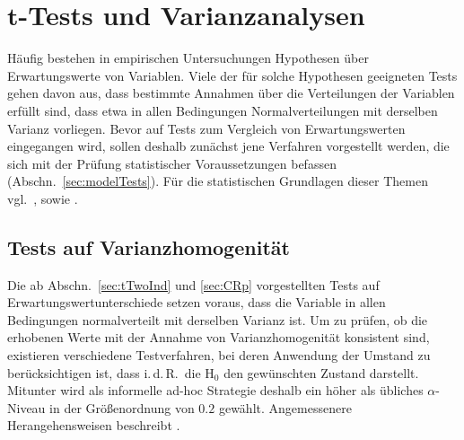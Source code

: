 \chapter[\texorpdfstring{$t$}{t}-Tests und Varianzanalysen]{$\bm{t}$-Tests und Varianzanalysen}
\label{sec:muTests}

Häufig bestehen in empirischen Untersuchungen Hypothesen über Erwartungswerte von Variablen. Viele der für solche Hypothesen geeigneten Tests gehen davon aus, dass bestimmte Annahmen über die Verteilungen der Variablen erfüllt sind, dass etwa in allen Bedingungen Normalverteilungen mit derselben Varianz vorliegen. Bevor auf Tests zum Vergleich von Erwartungswerten eingegangen wird, sollen deshalb zunächst jene Verfahren vorgestellt werden, die sich mit der Prüfung statistischer Voraussetzungen befassen (Abschn.\ \ref{sec:modelTests}). Für die statistischen Grundlagen dieser Themen vgl.\ ,  sowie .

\section{Tests auf Varianzhomogenität}
\label{sec:varHom}

Die ab Abschn.\ \ref{sec:tTwoInd} und \ref{sec:CRp} vorgestellten Tests auf Erwartungswertunterschiede setzen voraus, dass die Variable in allen Bedingungen normalverteilt mit derselben Varianz ist. Um zu prüfen, ob die erhobenen Werte mit der Annahme von Varianzhomogenität konsistent sind, existieren verschiedene Testverfahren, bei deren Anwendung der Umstand zu berücksichtigen ist, dass i.\,d.\,R.\ die $\text{H}_{0}$ den gewünschten Zustand darstellt. Mitunter wird als informelle ad-hoc Strategie deshalb ein höher als übliches $\alpha$-Niveau in der Größenordnung von $0.2$ gewählt. Angemessenere Herangehensweisen beschreibt .

